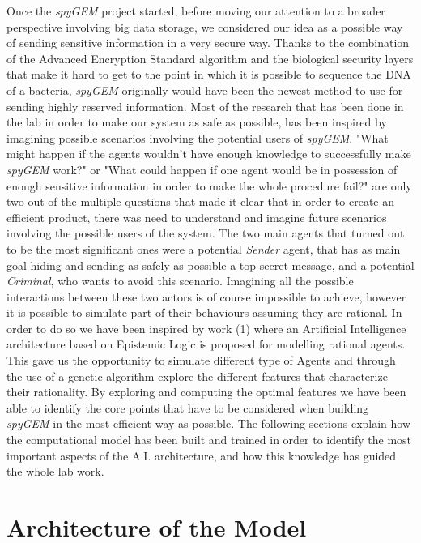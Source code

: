 \documentclass[a4paper]{article}
\begin{document}
Once the \textit{spyGEM} project started, before moving our attention to a broader perspective involving big data storage, we considered our idea as a possible way of sending sensitive information in a very secure way. Thanks to the combination of the Advanced Encryption Standard algorithm and the biological security layers that make it hard to get to the point in which it is possible to sequence the DNA of a bacteria, \textit{spyGEM} originally would have been the newest method to use for sending highly reserved information. Most of the research that has been done in the lab in order to make our system as safe as possible, has been inspired by imagining possible scenarios involving the potential users of \textit{spyGEM}. "What might happen if the agents wouldn't have enough knowledge to successfully make \textit{spyGEM} work?" or "What could happen if one agent would be in possession of enough sensitive information in order to make the whole procedure fail?" are only two out of the multiple questions that made it clear that in order to create an efficient product, there was need to understand and imagine future scenarios involving the possible users of the system. The two main agents that turned out to be the most significant ones were a potential \textit{Sender} agent, that has as main goal hiding and sending as safely as possible a top-secret message, and a potential \textit{Criminal}, who wants to avoid this scenario. Imagining all the possible interactions between these two actors is of course impossible to achieve, however it is possible to simulate part of their behaviours assuming they are rational. In order to do so we have been inspired by work (1) where an Artificial Intelligence architecture based on Epistemic Logic is proposed for modelling rational agents. This gave us the opportunity to simulate different type of Agents and through the use of a genetic algorithm explore the different features that characterize their rationality. By exploring and computing the optimal features we have been able to identify the core points that have to be considered when building \textit{spyGEM} in the most efficient way as possible. The following sections explain how the computational model has been built and trained in order to identify the most important aspects of the A.I. architecture, and how this knowledge has guided the whole lab work.   
 
\section{Architecture of the Model}
\end{document}
